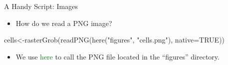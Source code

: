 \documentclass[
  ignorenonframetext,
]{beamer}
\newenvironment{Shaded}{\begin{snugshade}}{\end{snugshade}}
\newcommand{\AttributeTok}[1]{\textcolor[rgb]{0.40,0.45,0.13}{#1}}
\newcommand{\ConstantTok}[1]{\textcolor[rgb]{0.56,0.35,0.01}{#1}}
\newcommand{\FunctionTok}[1]{\textcolor[rgb]{0.28,0.35,0.67}{#1}}
\newcommand{\NormalTok}[1]{\textcolor[rgb]{0.00,0.23,0.31}{#1}}
\newcommand{\OtherTok}[1]{\textcolor[rgb]{0.00,0.23,0.31}{#1}}
\newcommand{\StringTok}[1]{\textcolor[rgb]{0.13,0.47,0.30}{#1}}
\providecommand{\tightlist}{%
  \setlength{\itemsep}{0pt}\setlength{\parskip}{0pt}}\usepackage{longtable,booktabs,array}
\begin{document}
\begin{frame}[fragile]{A Handy Script: Images}
\protect\hypertarget{a-handy-script-images-1}{}
\begin{itemize}[<+->]
\tightlist
\item
  How do we read a PNG image?
\end{itemize}

\footnotesize

\begin{Shaded}
\begin{Highlighting}[]
\NormalTok{cells}\OtherTok{\textless{}{-}}\FunctionTok{rasterGrob}\NormalTok{(}\FunctionTok{readPNG}\NormalTok{(}\FunctionTok{here}\NormalTok{(}\StringTok{"figures"}\NormalTok{,}
                               \StringTok{"cells.png"}\NormalTok{),}
                          \AttributeTok{native=}\ConstantTok{TRUE}\NormalTok{))}
\end{Highlighting}
\end{Shaded}

\normalsize

\begin{itemize}[<+->]
\tightlist
\item
  We use \textcolor{green}{{here}} to call the PNG file located in the
  ``figures'' directory.
\end{itemize}
\end{frame}
\end{document}
